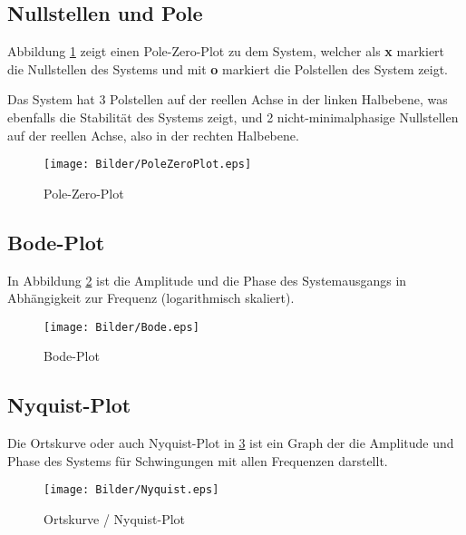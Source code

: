 \subsection{Nullstellen und Pole}

Abbildung \ref{fig:pzmap} zeigt einen Pole-Zero-Plot zu dem System, welcher als \textbf{x} markiert die Nullstellen des Systems und mit \textbf{o} markiert die Polstellen des System zeigt.

Das System hat 3 Polstellen auf der reellen Achse in der linken Halbebene, was ebenfalls die Stabilität des Systems zeigt, und 2 nicht-minimalphasige Nullstellen auf der reellen Achse, also in der rechten Halbebene.

\begin{figure}[H]
    \label{fig:pzmap}
    \centering
    \texttt{[image: Bilder/PoleZeroPlot.eps]}
    \caption{Pole-Zero-Plot}
 \end{figure}


\subsection{Bode-Plot}

In Abbildung \ref{fig:bode} ist die Amplitude und die Phase des Systemausgangs in Abhängigkeit zur Frequenz (logarithmisch skaliert).

\begin{figure}[H]
    \label{fig:bode}
    \centering
    \texttt{[image: Bilder/Bode.eps]}
    \caption{Bode-Plot}
 \end{figure}

\subsection{Nyquist-Plot}

Die Ortskurve oder auch Nyquist-Plot in \ref{fig:nyquist} ist ein Graph der die Amplitude und Phase des Systems für Schwingungen mit allen Frequenzen darstellt.

\begin{figure}[H]
    \label{fig:nyquist}
    \centering
    \texttt{[image: Bilder/Nyquist.eps]}
    \caption{Ortskurve / Nyquist-Plot}
 \end{figure}
